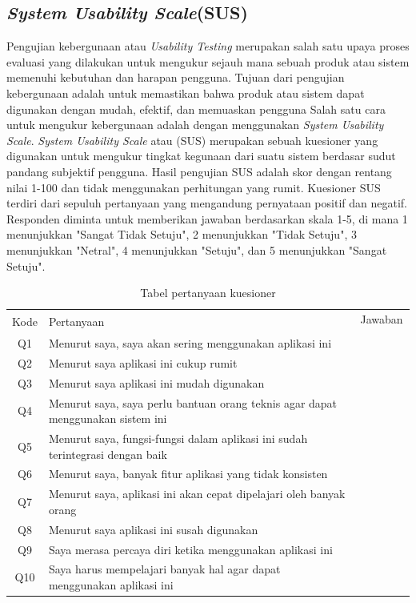 \subsection{\textit{System Usability Scale}(SUS)}
Pengujian kebergunaan atau \textit{Usability Testing} merupakan salah satu upaya proses evaluasi yang dilakukan untuk mengukur sejauh mana sebuah produk atau sistem memenuhi kebutuhan dan harapan pengguna. 
Tujuan dari pengujian kebergunaan adalah untuk memastikan bahwa produk atau sistem dapat digunakan dengan mudah, efektif, dan memuaskan pengguna
Salah satu cara untuk mengukur kebergunaan adalah dengan menggunakan \textit{System Usability Scale}. \textit{System Usability Scale} atau (SUS) merupakan sebuah kuesioner yang digunakan untuk mengukur tingkat kegunaan dari suatu sistem berdasar sudut pandang subjektif pengguna.
Hasil pengujian SUS adalah skor dengan rentang nilai 1-100 dan tidak menggunakan perhitungan yang rumit. 
Kuesioner SUS terdiri dari sepuluh pertanyaan yang mengandung pernyataan positif dan negatif. 
Responden diminta untuk memberikan jawaban berdasarkan skala 1-5, di mana 1 menunjukkan "Sangat Tidak Setuju", 2 menunjukkan "Tidak Setuju", 3 menunjukkan "Netral", 4 menunjukkan "Setuju", dan 5 menunjukkan "Sangat Setuju".
\begin{table}[H]
	\caption{Tabel pertanyaan kuesioner}
	\centering
	\begin{tabular}{|c|m{7cm}|m{0.5cm}|m{0.5cm}|m{0.5cm}|m{0.5cm}|m{0.5cm}|}
		\hline
		\multirow{2}{1cm}{Kode} & \multirow{2}{7cm}{\centering Pertanyaan}& \multicolumn{5}{c|}{\centering Jawaban} \\
		\cline{3-7}
		 & &\centering 1 & \centering  2 & \centering 3 & \centering 4 & \multicolumn{1}{m{0.5cm}|}{\centering 5} \\
		 \hline
		 Q1&Menurut saya, saya akan sering menggunakan aplikasi ini& &  &  &  &  \\
		 \hline
		 Q2&Menurut saya aplikasi ini cukup rumit& & & &  &  \\
		 \hline
		 Q3&Menurut saya aplikasi ini mudah digunakan& & & & & \\
		 \hline
		 Q4&Menurut saya, saya perlu bantuan orang teknis agar dapat menggunakan sistem ini& & & & & \\
		 \hline
		 Q5&Menurut saya, fungsi-fungsi dalam aplikasi ini sudah terintegrasi dengan baik& & & & & \\
		 \hline
		 Q6&Menurut saya, banyak fitur aplikasi yang tidak konsisten& & & & & \\
		 \hline
		 Q7&Menurut saya, aplikasi ini akan cepat dipelajari oleh banyak orang& & & & & \\
		 \hline
		 Q8&Menurut saya aplikasi ini susah digunakan& & & & & \\
		 \hline
		 Q9&Saya merasa percaya diri ketika menggunakan aplikasi ini& & & & & \\
		 \hline
		 Q10&Saya harus mempelajari banyak hal agar dapat menggunakan aplikasi ini& & & & & \\
		 \hline
	\end{tabular}
\end{table}
